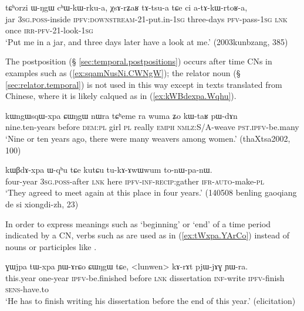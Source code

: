 \begin{exe}
\ex \label{ex:tAtsua}
\gll  tɕʰorzi ɯ-ŋgɯ cʰɯ-kɯ-rku-a, χsɤ-rʑaʁ tɤ-tsu-a tɕe ci a-tɤ-kɯ-rtoʁ-a, \\
jar \textsc{3sg}.\textsc{poss}-inside \textsc{ipfv:downstream}-2\fl{}1-put.in-\textsc{1sg} three-days \textsc{pfv}-pass-\textsc{1sg} \textsc{lnk} once \textsc{irr}-\textsc{pfv}-2\fl{}1-look-\textsc{1sg} \\
\glt `Put me in a jar, and three days later have a look at me.' (2003kunbzang, 385)
\end{exe} 

The postposition  (§ \ref{sec:temporal.postpositions}) occurs after time CNs in examples such as (\ref{ex:sqamNusNi.CWNgW}); the relator noun  (§ \ref{sec:relator.temporal}) is not used in this way except in texts translated from Chinese, where it is likely calqued as in (\ref{ex:kWBdexpa.Wqhu}).

\begin{exe}
\ex \label{ex:ngWsqWxpa.CWNgW}
 \gll kɯngɯsqɯ-xpa ɕɯŋgɯ nɯra tɕʰeme ra wuma ʑo kɯ-taʁ pɯ-dɤn \\
nine.ten-years before \textsc{dem}:\textsc{pl} girl \textsc{pl} really \textsc{emph} \textsc{nmlz}:S/A-weave \textsc{pst}.\textsc{ipfv}-be.many \\
 \glt `Nine or ten years ago, there were many weavers among women.' (thaXtsa2002, 100)
\end{exe}

\begin{exe}
\ex \label{ex:kWBdexpa.Wqhu}
\gll  kɯβdɤ-xpa ɯ-qʰu tɕe kutɕu tu-kɤ-ɤwɯwum to-nɯ-pa-nɯ. \\
four-year \textsc{3sg}.\textsc{poss}-after \textsc{lnk} here \textsc{ipfv}-\textsc{inf}-\textsc{recip}:gather \textsc{ifr}-\textsc{auto}-make-\textsc{pl} \\
\glt `They agreed to meet again at this place in four years.' (140508 benling gaoqiang de si xiongdi-zh, 23)
\end{exe} 

In order to express meanings such as `beginning' or `end' of a time period indicated by a CN, verbs such as  are used as in (\ref{ex:tWxpa.YArCo}) instead of nouns or participles like .

\begin{exe}
\ex \label{ex:tWxpa.YArCo}
\gll ɣɯjpa tɯ-xpa ɲɯ-ɤrɕo ɕɯŋgɯ tɕe, <lunwen> kɤ-rɤt pjɯ-jɤɣ ɲɯ-ra. \\
this.year one-year \textsc{ipfv}-be.finished  before \textsc{lnk} dissertation \textsc{inf}-write \textsc{ipfv}-finish \textsc{sens}-have.to \\
\glt `He has to finish writing his dissertation before the end of this year.' (elicitation)
\end{exe} 

